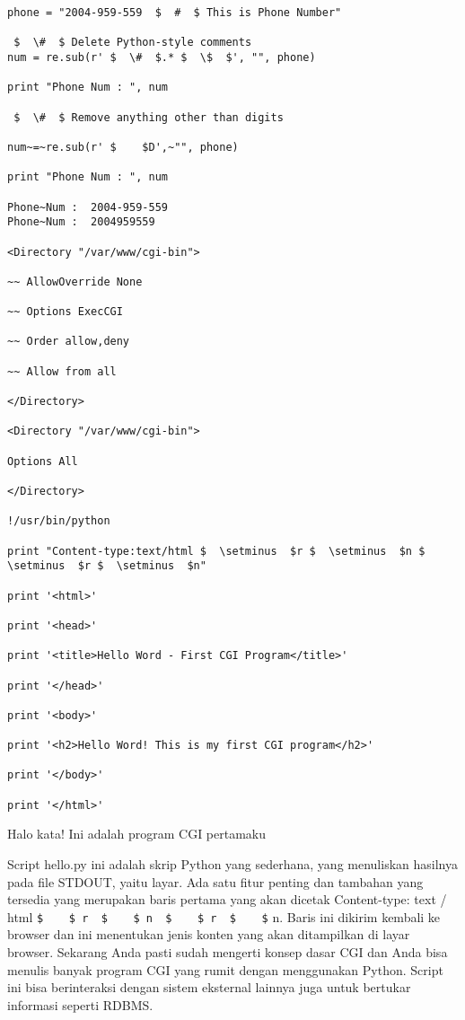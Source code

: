 \begin {enumerate}
\begin {enumerate}
\begin{verbatim}
phone = "2004-959-559  $  #  $ This is Phone Number"

 $  \#  $ Delete Python-style comments
num = re.sub(r' $  \#  $.* $  \$  $', "", phone)

print "Phone Num : ", num

 $  \#  $ Remove anything other than digits

num~=~re.sub(r' $    $D',~"", phone)

print "Phone Num : ", num

Phone~Num :  2004-959-559
Phone~Num :  2004959559

<Directory "/var/www/cgi-bin">

~~ AllowOverride None

~~ Options ExecCGI

~~ Order allow,deny

~~ Allow from all

</Directory>

<Directory "/var/www/cgi-bin">

Options All

</Directory>

!/usr/bin/python

print "Content-type:text/html $  \setminus  $r $  \setminus  $n $  \setminus  $r $  \setminus  $n"

print '<html>'

print '<head>'

print '<title>Hello Word - First CGI Program</title>'

print '</head>'

print '<body>'

print '<h2>Hello Word! This is my first CGI program</h2>'

print '</body>'

print '</html>'
\end{verbatim}

Halo kata! Ini adalah program CGI pertamaku

Script hello.py ini adalah skrip Python yang sederhana, yang menuliskan hasilnya pada file STDOUT, yaitu layar. Ada satu fitur penting dan tambahan yang tersedia yang merupakan baris pertama yang akan dicetak Content-type: text / html  \verb|$    $ r  $    $ n  $    $ r  $    $| n. Baris ini dikirim kembali ke browser dan ini menentukan jenis konten yang akan ditampilkan di layar browser. Sekarang Anda pasti sudah mengerti konsep dasar CGI dan Anda bisa menulis banyak program CGI yang rumit dengan menggunakan Python. Script ini bisa berinteraksi dengan sistem eksternal lainnya juga untuk bertukar informasi seperti RDBMS.


\end{enumerate}
\end{enumerate}
